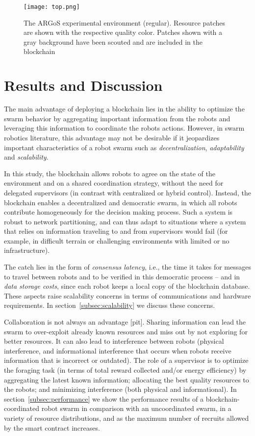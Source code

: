 \documentclass[runningheads]{llncs}
\begin{document}
\begin{figure}
  \centering
  \texttt{[image: top.png]}
  \caption{The ARGoS experimental environment (regular). Resource patches are shown with the respective quality color. Patches shown with a gray background have been scouted and are included in the blockchain} 
  \label{fig:arena}
\end{figure}

\section{Results and Discussion}
\label{sec:results-and-discussion}

The main advantage of deploying a blockchain lies in the ability to optimize the swarm behavior by aggregating important information from the robots and leveraging this information to coordinate the robots actions. However, in swarm robotics literature, this advantage may not be desirable if it jeopardizes important characteristics of a robot swarm such as \emph{decentralization}, \emph{adaptability} and \emph{scalability}.

In this study, the blockchain allows robots to agree on the state of the environment and on a shared coordination strategy, without the need for delegated supervisors (in contrast with centralized or hybrid control). Instead, the blockchain enables a decentralized and democratic swarm, in which all robots contribute homogeneously for the decision making process. Such a system is robust to network partitioning, and can thus adapt to situations where a system that relies on information traveling to and from supervisors would fail (for example, in difficult terrain or challenging environments with limited or no infrastructure). 

The catch lies in the form of \emph{consensus latency}, i.e., the time it takes for messages to travel between robots and to be verified in this democratic process -- and in \emph{data storage costs}, since each robot keeps a local copy of the blockchain database. These aspects raise scalability concerns in terms of communications and hardware requirements. In section~\ref{subsec:scalability} we discuss these concerns.

Collaboration is not always an advantage [pit]. Sharing information can lead the swarm to over-exploit already known resources and miss out by not exploring for better resources. It can also lead to interference between robots (physical interference, and informational interference that occurs when robots receive information that is incorrect or outdated). The role of a supervisor is to optimize the foraging task (in terms of total reward collected and/or energy efficiency) by aggregating the latest known information; allocating the best quality resources to the robots; and minimizing interference (both physical and informational). In section~\ref{subsec:performance} we show the performance results of a blockchain-coordinated robot swarm in comparison with an uncoordinated swarm, in a variety of resource distributions, and as the maximum number of recruits allowed by the smart contract increases.
\end{document}
